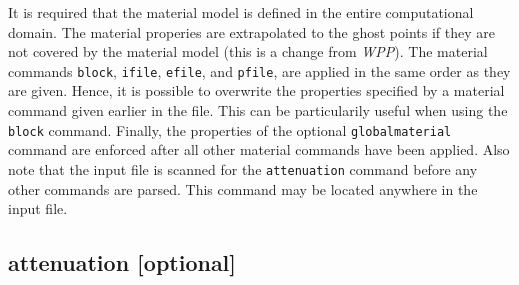 \documentclass[11pt]{report}
\begin{document}
It is required that the material model is defined in the entire computational domain. The material
properies are extrapolated to the ghost points if they are not covered by the material model (this
is a change from \emph{WPP}). The material commands \verb+block+, \verb+ifile+, \verb+efile+, and
\verb+pfile+, are applied in the same order as they are given. Hence, it is possible to overwrite
the properties specified by a material command given earlier in the file. This can be particularily
useful when using the \verb+block+ command. Finally, the properties of the optional
\verb+globalmaterial+ command are enforced after all other material commands have been applied. Also
note that the input file is scanned for the \verb+attenuation+ command before any other commands are
parsed. This command may be located anywhere in the input file.

\subsection{attenuation [optional]}
\label{keyword:attenuation}
\end{document}
